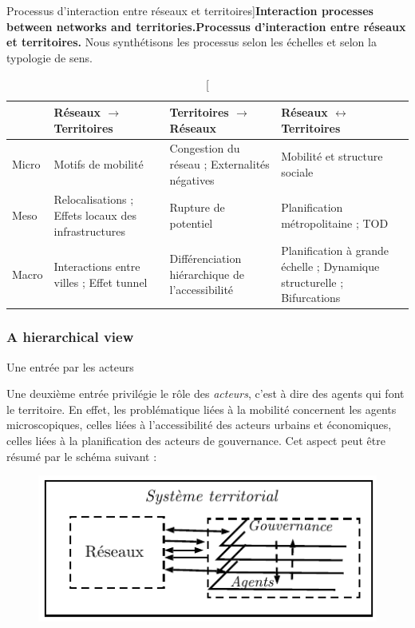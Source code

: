 \begin{table}%
\caption[Interaction processes between networks and territories][Processus d'interaction entre réseaux et territoires]{\textbf{Interaction processes between networks and territories.}\label{tab:thematic:processes}}{\textbf{Processus d'interaction entre réseaux et territoires.} Nous synthétisons les processus selon les échelles et selon la typologie de sens.\label{tab:thematic:processes}}
\begin{tabular}{|l|p{5cm}|p{5cm}|p{5cm}|}
\hline
 & Réseaux $\rightarrow$ Territoires & Territoires $\rightarrow$ Réseaux & Réseaux $\leftrightarrow$ Territoires\\ \hline
Micro & Motifs de mobilité & Congestion du réseau ; Externalités négatives & Mobilité et structure sociale \\ \hline
Meso & Relocalisations ; Effets locaux des infrastructures & Rupture de potentiel & Planification métropolitaine ; TOD \\ \hline
Macro & Interactions entre villes ; Effet tunnel & Différenciation hiérarchique de l'accessibilité & Planification à grande échelle ; Dynamique structurelle ; Bifurcations\\ \hline
\end{tabular}
\end{table}



\subsubsection*{A hierarchical view}{Une entrée par les acteurs}


Une deuxième entrée privilégie le rôle des \emph{acteurs}, c'est à dire des agents qui font le territoire. En effet, les problématique liées à la mobilité concernent les agents microscopiques, celles liées à l'accessibilité des acteurs urbains et économiques, celles liées à la planification des acteurs de gouvernance. Cet aspect peut être résumé par le schéma suivant :


\begin{figure}[h!]
\includegraphics[width=\textwidth]{Figures/Theory/processes_acteurs}
\end{figure}


